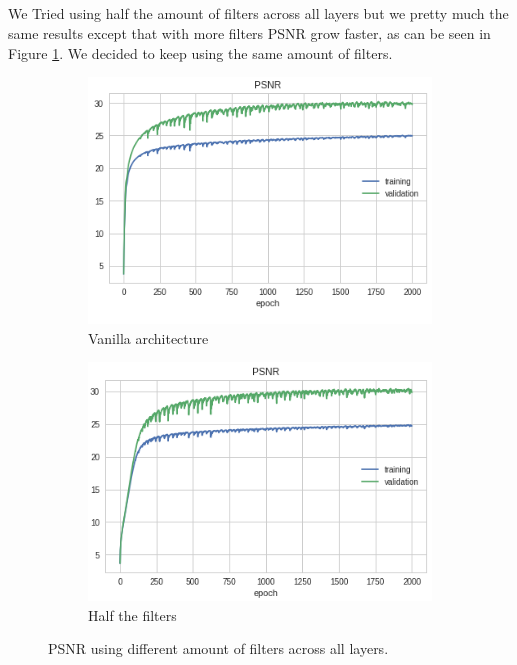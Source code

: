 \documentclass[12pt]{article}
\begin{document}
\subsection{}
We Tried using half the amount of filters across all layers but we pretty much the same results except that with more filters PSNR grow faster, as can be seen in Figure \ref{resnet_vs_densnet}. We decided to keep using the same amount of filters.

\begin{figure}[h]
  \centering
  \begin{subfigure}[b]{0.4\linewidth}
    \includegraphics[width=\linewidth]{2dr.png}
    \caption{Vanilla architecture}
  \end{subfigure}
  \begin{subfigure}[b]{0.4\linewidth}
    \includegraphics[width=\linewidth]{2ds_half_filters.png}
    \caption{Half the filters}
  \end{subfigure}
  \caption{PSNR using different amount of filters across all layers.}
  \label{resnet_vs_densnet}
\end{figure}
\end{document}
